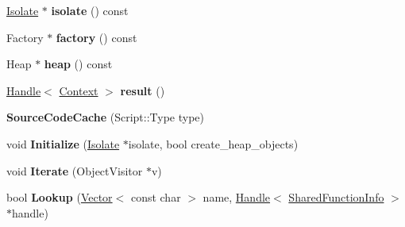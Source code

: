 \begin{DoxyCompactItemize}
\item 
\hypertarget{classv8_1_1internal_1_1_b_a_s_e___e_m_b_e_d_d_e_d_aafca7727b44748c75ff39a90282dfb8d}{}\hyperlink{classv8_1_1internal_1_1_isolate}{Isolate} $\ast$ {\bfseries isolate} () const \label{classv8_1_1internal_1_1_b_a_s_e___e_m_b_e_d_d_e_d_aafca7727b44748c75ff39a90282dfb8d}

\item 
\hypertarget{classv8_1_1internal_1_1_b_a_s_e___e_m_b_e_d_d_e_d_ac1997ab9dd7c081779a7e0999ef4713d}{}Factory $\ast$ {\bfseries factory} () const \label{classv8_1_1internal_1_1_b_a_s_e___e_m_b_e_d_d_e_d_ac1997ab9dd7c081779a7e0999ef4713d}

\item 
\hypertarget{classv8_1_1internal_1_1_b_a_s_e___e_m_b_e_d_d_e_d_acae6ee69fbbd8ecbc4327360b64f2ed1}{}Heap $\ast$ {\bfseries heap} () const \label{classv8_1_1internal_1_1_b_a_s_e___e_m_b_e_d_d_e_d_acae6ee69fbbd8ecbc4327360b64f2ed1}

\item 
\hypertarget{classv8_1_1internal_1_1_b_a_s_e___e_m_b_e_d_d_e_d_aa56e4d1b2bf22d809b9872eb8934800f}{}\hyperlink{classv8_1_1internal_1_1_handle}{Handle}$<$ \hyperlink{classv8_1_1internal_1_1_context}{Context} $>$ {\bfseries result} ()\label{classv8_1_1internal_1_1_b_a_s_e___e_m_b_e_d_d_e_d_aa56e4d1b2bf22d809b9872eb8934800f}

\item 
\hypertarget{classv8_1_1internal_1_1_b_a_s_e___e_m_b_e_d_d_e_d_a00040f88682aea4912c913419b62baf3}{}{\bfseries Source\+Code\+Cache} (Script\+::\+Type type)\label{classv8_1_1internal_1_1_b_a_s_e___e_m_b_e_d_d_e_d_a00040f88682aea4912c913419b62baf3}

\item 
\hypertarget{classv8_1_1internal_1_1_b_a_s_e___e_m_b_e_d_d_e_d_a0d5adaacfd2999131d569cb5f9d5af78}{}void {\bfseries Initialize} (\hyperlink{classv8_1_1internal_1_1_isolate}{Isolate} $\ast$isolate, bool create\+\_\+heap\+\_\+objects)\label{classv8_1_1internal_1_1_b_a_s_e___e_m_b_e_d_d_e_d_a0d5adaacfd2999131d569cb5f9d5af78}

\item 
\hypertarget{classv8_1_1internal_1_1_b_a_s_e___e_m_b_e_d_d_e_d_ac230b60216dbf133ae0238c502dd0dd9}{}void {\bfseries Iterate} (Object\+Visitor $\ast$v)\label{classv8_1_1internal_1_1_b_a_s_e___e_m_b_e_d_d_e_d_ac230b60216dbf133ae0238c502dd0dd9}

\item 
\hypertarget{classv8_1_1internal_1_1_b_a_s_e___e_m_b_e_d_d_e_d_aa921c590f47e51cee28d78361f7d4cb0}{}bool {\bfseries Lookup} (\hyperlink{classv8_1_1internal_1_1_vector}{Vector}$<$ const char $>$ name, \hyperlink{classv8_1_1internal_1_1_handle}{Handle}$<$ \hyperlink{classv8_1_1internal_1_1_shared_function_info}{Shared\+Function\+Info} $>$ $\ast$handle)\label{classv8_1_1internal_1_1_b_a_s_e___e_m_b_e_d_d_e_d_aa921c590f47e51cee28d78361f7d4cb0}


\end{DoxyCompactItemize}
